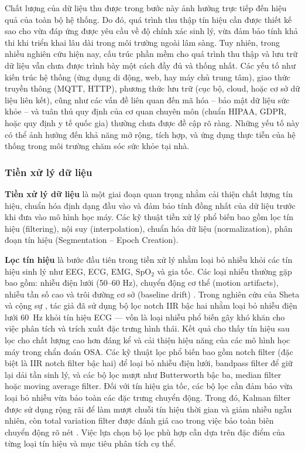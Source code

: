 Chất lượng của dữ liệu thu được trong bước này ảnh hưởng trực tiếp đến 
hiệu quả của toàn bộ hệ thống. Do đó, quá trình thu thập tín hiệu cần 
được thiết kế sao cho vừa đáp ứng được yêu cầu về độ chính xác sinh lý, 
vừa đảm bảo tính khả thi khi triển khai lâu dài trong môi trường ngoài 
lâm sàng. Tuy nhiên, trong nhiều nghiên cứu hiện nay, cấu trúc phần mềm
cho quá trình thu thập và lưu trữ dữ liệu vẫn chưa được trình bày một 
cách đầy đủ và thống nhất. Các yếu tố như kiến trúc hệ thống 
(ứng dụng di động, web, hay máy chủ trung tâm), giao thức truyền thông 
(MQTT, HTTP), phương thức lưu trữ (cục bộ, cloud, hoặc cơ sở dữ liệu 
liên kết), cũng như các vấn đề liên quan đến mã hóa – bảo mật dữ liệu 
sức khỏe – và tuân thủ quy định của cơ quan chuyên môn (chuẩn HIPAA, GDPR, 
hoặc quy định y tế quốc gia) thường chưa được đề cập rõ ràng. 
Những yếu tố này có thể ảnh hưởng đến khả năng mở rộng, tích hợp, 
và ứng dụng thực tiễn của hệ thống trong môi trường chăm sóc sức khỏe 
tại nhà.


\subsubsection{Tiền xử lý dữ liệu}



\textbf{Tiền xử lý dữ liệu} là một giai đoạn quan trọng nhằm cải thiện 
chất lượng tín hiệu, chuẩn hóa định dạng đầu vào và đảm bảo tính đồng 
nhất của dữ liệu trước khi đưa vào mô hình học máy. Các kỹ thuật tiền xử 
lý phổ biến bao gồm lọc tín hiệu (filtering), nội suy (interpolation), 
chuẩn hóa dữ liệu (normalization), phân đoạn tín hiệu (Segmentation – Epoch Creation).

\textbf{Lọc tín hiệu} là bước đầu tiên trong tiền xử lý nhằm loại bỏ nhiễu khỏi 
các tín hiệu sinh lý như EEG, ECG, EMG, $\mathrm{SpO_2}$ và gia tốc. 
Các loại nhiễu thường gặp bao gồm: nhiễu điện lưới (50–60 Hz), 
chuyển động cơ thể (motion artifacts), nhiễu tần số cao và trôi đường 
cơ sở (baseline drift) \cite{rossi2023sleep, sheta2021osa }. 
Trong nghiên cứu của Sheta và cộng sự \cite{sheta2021osa}, tác giả đã sử 
dụng bộ lọc notch IIR bậc hai nhằm loại bỏ nhiễu điện lưới 60~Hz khỏi 
tín hiệu ECG — vốn là loại nhiễu phổ biến gây khó khăn cho việc phân 
tích và trích xuất đặc trưng hình thái. Kết quả cho thấy tín hiệu sau 
lọc cho chất lượng cao hơn đáng kể và cải thiện hiệu năng của các mô 
hình học máy trong chẩn đoán OSA.
Các kỹ thuật lọc phổ biến bao gồm notch filter 
(đặc biệt là IIR notch filter bậc hai) để loại bỏ nhiễu điện lưới, 
bandpass filter để giữ lại dải tần sinh lý, và 
các bộ lọc mượt như Butterworth bậc ba, median filter hoặc 
moving average filter.
Đối với tín hiệu gia tốc, các bộ lọc cần đảm bảo vừa loại bỏ nhiễu vừa 
bảo toàn các đặc trưng chuyển động. Trong đó, Kalman filter được sử dụng 
rộng rãi để làm mượt chuỗi tín hiệu thời gian và giảm nhiễu ngẫu nhiên, 
còn total variation filter được đánh giá cao trong việc bảo toàn biên 
chuyển động rõ nét \cite{kalman, sun2017sleepmonitor}. 
Việc lựa chọn bộ lọc phù hợp cần dựa trên đặc điểm của từng loại 
tín hiệu và mục tiêu phân tích cụ thể.

